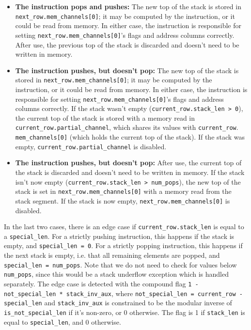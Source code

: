 \begin{itemize}
  \item \textbf{The instruction pops and pushes:} The new top of the stack is stored in \texttt{next\_row.mem\_channels[0]}; it may be computed by the instruction,
or it could be read from memory. In either case, the instruction is responsible for setting \texttt{next\_row.mem\_channels[0]}'s flags and address columns correctly.
After use, the previous top of the stack is discarded and doesn't need to be written in memory.
  \item \textbf{The instruction pushes, but doesn't pop:} The new top of the stack is stored in \texttt{next\_row.mem\_channels[0]}; it may be computed by the instruction,
or it could be read from memory. In either case, the instruction is responsible for setting \texttt{next\_row.mem\_channels[0]}'s flags and address columns correctly.
If the stack wasn't empty (\texttt{current\_row.stack\_len > 0}), the current top of the stack is stored with a memory read in \texttt{current\_row.partial\_channel},
which shares its values with \texttt{current\_row}. \texttt{mem\_channels[0]} (which holds the current top of the stack). If the stack was empty, \texttt{current\_row.partial\_channel}
is disabled.
  \item \textbf{The instruction pushes, but doesn't pop:} After use, the current top of the stack is discarded and doesn't need to be written in memory.
If the stack isn't now empty (\texttt{current\_row.stack\_len > num\_pops}), the new top of the stack is set in \texttt{next\_row.mem\_channels[0]}
with a memory read from the stack segment. If the stack is now empty, \texttt{next\_row.mem\_channels[0]} is disabled.
\end{itemize}

In the last two cases, there is an edge case if \texttt{current\_row.stack\_len} is equal to a \texttt{special\_len}. For a strictly pushing instruction,
this happens if the stack is empty, and \texttt{special\_len = 0}. For a strictly popping instruction, this happens if the next stack is empty, i.e. that
all remaining elements are popped, and \texttt{special\_len = num\_pops}. Note that we do not need to check for values below \texttt{num\_pops}, since this
would be a stack underflow exception which is handled separately.
The edge case is detected with the compound flag \texttt{1 - not\_special\_len * stack\_inv\_aux}, where \texttt{not\_special\_len = current\_row - special\_len}
and \texttt{stack\_inv\_aux} is constrained to be the modular inverse of \texttt{is\_not\_special\_len} if it's non-zero, or 0 otherwise. The flag is 1
if \texttt{stack\_len} is equal to \texttt{special\_len}, and 0 otherwise.

